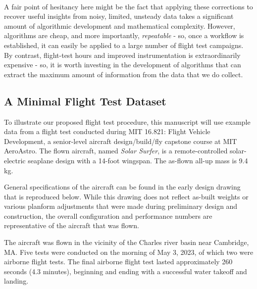 \documentclass[11pt]{article}
\newcommand{\prompt}[4]{
        {\ttfamily\llap{{\color{#2}[#3]:\hspace{3pt}#4}}\vspace{-\baselineskip}}
    }
\begin{document}
            
\prompt{Out}{outcolor}{1}{}
    
    \begin{center}
    \end{center}
    { \hspace*{\fill} \\}
    

    A fair point of hesitancy here might be the fact that applying these
corrections to recover useful insights from noisy, limited, unsteady
data takes a significant amount of algorithmic development and
mathematical complexity. However, algorithms are cheap, and more
importantly, \emph{repeatable} - so, once a workflow is established, it
can easily be applied to a large number of flight test campaigns. By
contrast, flight-test hours and improved instrumentation is
extraordinarily expensive - so, it is worth investing in the development
of algorithms that can extract the maximum amount of information from
the data that we do collect.

    \hypertarget{a-minimal-flight-test-dataset}{%
\subsection{A Minimal Flight Test
Dataset}\label{a-minimal-flight-test-dataset}}

    To illustrate our proposed flight test procedure, this manuscript will
use example data from a flight test conducted during MIT 16.821: Flight
Vehicle Development, a senior-level aircraft design/build/fly capstone
course at MIT AeroAstro. The flown aircraft, named \emph{Solar Surfer},
is a remote-controlled solar-electric seaplane design with a 14-foot
wingspan. The as-flown all-up mass is 9.4 kg.

    

    General specifications of the aircraft can be found in the early design
drawing that is reproduced below. While this drawing does not reflect
as-built weights or various planform adjustments that were made during
preliminary design and construction, the overall configuration and
performance numbers are representative of the aircraft that was flown.

    

    The aircraft was flown in the vicinity of the Charles river basin near
Cambridge, MA. Five tests were conducted on the morning of May 3, 2023,
of which two were airborne flight tests. The final airborne flight test
lasted approximately 260 seconds (4.3 minutes), beginning and ending
with a successful water takeoff and landing.
\end{document}
